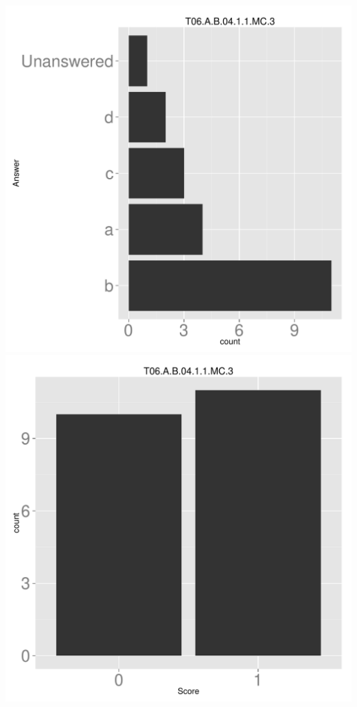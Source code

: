\documentclass[12pt,nohyper]{tufte-handout}\usepackage[]{graphicx}\usepackage[]{color}
\begin{document}
\begin{center} \includegraphics[width=.45\linewidth]{Topic06_7_answer} \includegraphics[width=.45\linewidth]{Topic06_7_score} \end{center} 
\end{document}

